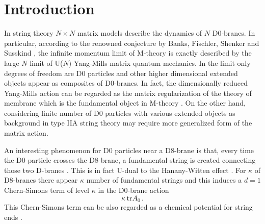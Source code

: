 \documentclass[a4paper,12pt]{article}
\def\tr{\mbox{tr}}
\begin{document}
\section{Introduction}
In string theory $N\times N$ matrix models describe the dynamics of $N$ D0-branes.  In particular, according to
the renowned conjecture by Banks, Fischler, Shenker and Susskind \cite{BFSS},  the infinite momentum limit of
M-theory is exactly described by the large $N$ limit of   U($N$) Yang-Mills matrix quantum mechanics.  In the
limit only degrees of freedom are D0 particles and other higher dimensional extended objects appear as composites
of D0-branes. In fact, the dimensionally reduced Yang-Mills  action can be regarded as the matrix regularization
of the theory of membrane  which is the fundamental object in M-theory \cite{HoppePhD}. On the other hand,
considering finite number of D0 particles with various extended objects as background in type IIA string theory
may require more generalized form of the matrix action. \newline




An interesting phenomenon for D0 particles near a D8-brane is that, every time  the D0 particle crosses the
D8-brane, a fundamental string is created connecting  those two D-branes \cite{9705084}. This  is in fact U-dual
to the Hanany-Witten effect \cite{9611230}. For $\kappa$ of  D8-branes there appear $\kappa$ number of fundamental
strings and this induces a $d=1$ Chern-Simons term of level $\kappa$ in the D0-brane action
\begin{equation}
\kappa\,\tr A_{0}\,.
\end{equation}
This Chern-Simons term can be also regarded as  a chemical potential for string ends \cite{0107200}.\newline
\end{document}
